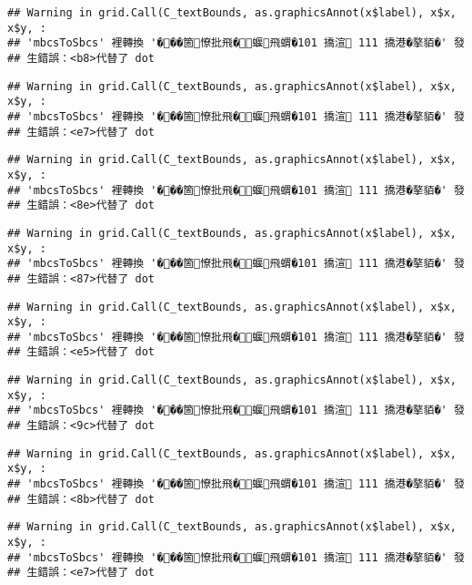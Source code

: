 \documentclass[
]{article}
\begin{document}
\begin{verbatim}
## Warning in grid.Call(C_textBounds, as.graphicsAnnot(x$label), x$x, x$y, :
## 'mbcsToSbcs' 裡轉換 '���箇憭批飛�蝘飛蝟�101 撟渲 111 撟港�摮貊�' 發
## 生錯誤：<b8>代替了 dot
\end{verbatim}

\begin{verbatim}
## Warning in grid.Call(C_textBounds, as.graphicsAnnot(x$label), x$x, x$y, :
## 'mbcsToSbcs' 裡轉換 '���箇憭批飛�蝘飛蝟�101 撟渲 111 撟港�摮貊�' 發
## 生錯誤：<e7>代替了 dot
\end{verbatim}

\begin{verbatim}
## Warning in grid.Call(C_textBounds, as.graphicsAnnot(x$label), x$x, x$y, :
## 'mbcsToSbcs' 裡轉換 '���箇憭批飛�蝘飛蝟�101 撟渲 111 撟港�摮貊�' 發
## 生錯誤：<8e>代替了 dot
\end{verbatim}

\begin{verbatim}
## Warning in grid.Call(C_textBounds, as.graphicsAnnot(x$label), x$x, x$y, :
## 'mbcsToSbcs' 裡轉換 '���箇憭批飛�蝘飛蝟�101 撟渲 111 撟港�摮貊�' 發
## 生錯誤：<87>代替了 dot
\end{verbatim}

\begin{verbatim}
## Warning in grid.Call(C_textBounds, as.graphicsAnnot(x$label), x$x, x$y, :
## 'mbcsToSbcs' 裡轉換 '���箇憭批飛�蝘飛蝟�101 撟渲 111 撟港�摮貊�' 發
## 生錯誤：<e5>代替了 dot
\end{verbatim}

\begin{verbatim}
## Warning in grid.Call(C_textBounds, as.graphicsAnnot(x$label), x$x, x$y, :
## 'mbcsToSbcs' 裡轉換 '���箇憭批飛�蝘飛蝟�101 撟渲 111 撟港�摮貊�' 發
## 生錯誤：<9c>代替了 dot
\end{verbatim}

\begin{verbatim}
## Warning in grid.Call(C_textBounds, as.graphicsAnnot(x$label), x$x, x$y, :
## 'mbcsToSbcs' 裡轉換 '���箇憭批飛�蝘飛蝟�101 撟渲 111 撟港�摮貊�' 發
## 生錯誤：<8b>代替了 dot
\end{verbatim}

\begin{verbatim}
## Warning in grid.Call(C_textBounds, as.graphicsAnnot(x$label), x$x, x$y, :
## 'mbcsToSbcs' 裡轉換 '���箇憭批飛�蝘飛蝟�101 撟渲 111 撟港�摮貊�' 發
## 生錯誤：<e7>代替了 dot
\end{verbatim}
\end{document}
